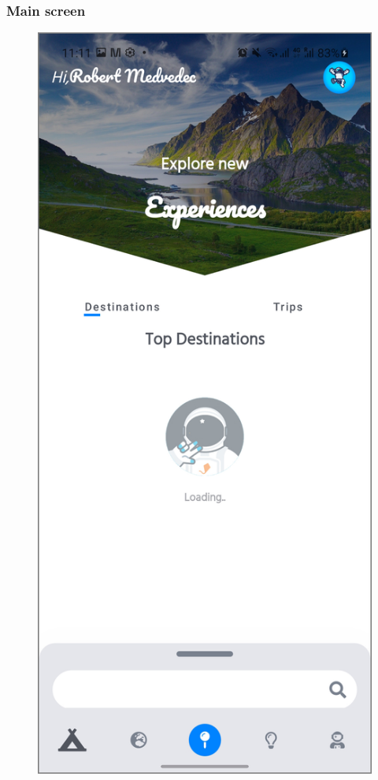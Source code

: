 \subsubsection{Main screen}

\begin{figure}[!htb]
\centering
\begin{minipage}{.48\textwidth}
\centering
\includegraphics[width=.9\textwidth]{../Images/UI/MainLight.jpg}

\end{minipage}
\end{figure}

